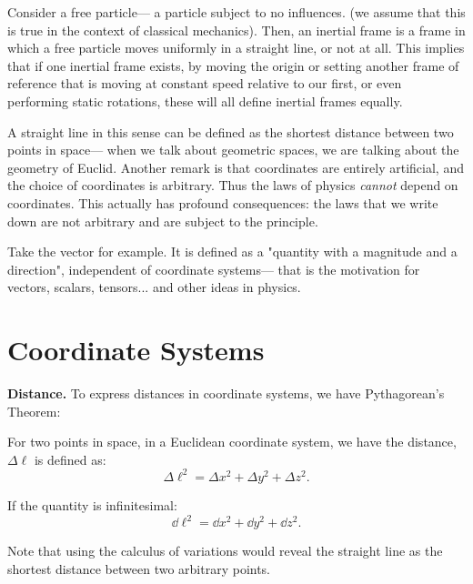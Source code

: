 \documentclass[10pt]{article}
\begin{document}
	\vspace{1\baselineskip}
	Consider a free particle— a particle subject to no influences. (we assume that this is true in the context of classical mechanics). Then, an inertial frame is a frame in which a free particle moves uniformly in a straight line, or not at all. This implies that if one inertial frame exists, by moving the origin or setting another frame of reference that is moving at constant speed relative to our first, or even performing static rotations, these will all define inertial frames equally.

	\vspace{1\baselineskip}
	A straight line in this sense can be defined as the shortest distance between two points in space— when we talk about geometric spaces, we are talking about the geometry of Euclid. Another remark is that coordinates are entirely artificial, and the choice of coordinates is arbitrary. Thus the laws of physics \textit{cannot} depend on coordinates. This actually has profound consequences: the laws that we write down are not arbitrary and are subject to the principle.

	\vspace{1\baselineskip}
	Take the vector for example. It is defined as a "quantity with a magnitude and a direction", independent of coordinate systems— that is the motivation for vectors, scalars, tensors... and other ideas in physics. 

	\newpage
	\section{Coordinate Systems}
	\textbf{Distance.} To express distances in coordinate systems, we have Pythagorean's Theorem:
	\begin{theorem}
		For two points in space, in a Euclidean coordinate system, we have the distance, $\Delta \ell$ is defined as:
		\begin{equation}
		  \Delta \ell^{2} = \Delta x^{2} + \Delta y^{2} + \Delta z^{2}.
		\end{equation}

		If the quantity is infinitesimal:
		\begin{equation}
		  \dd \ell^{2} = \dd x^{2} + \dd y^{2} + \dd z^{2}.
		\end{equation}
	\end{theorem}

	\begin{remark}
		Note that using the calculus of variations would reveal the straight line as the shortest distance between two arbitrary points.
	\end{remark}
\end{document}
